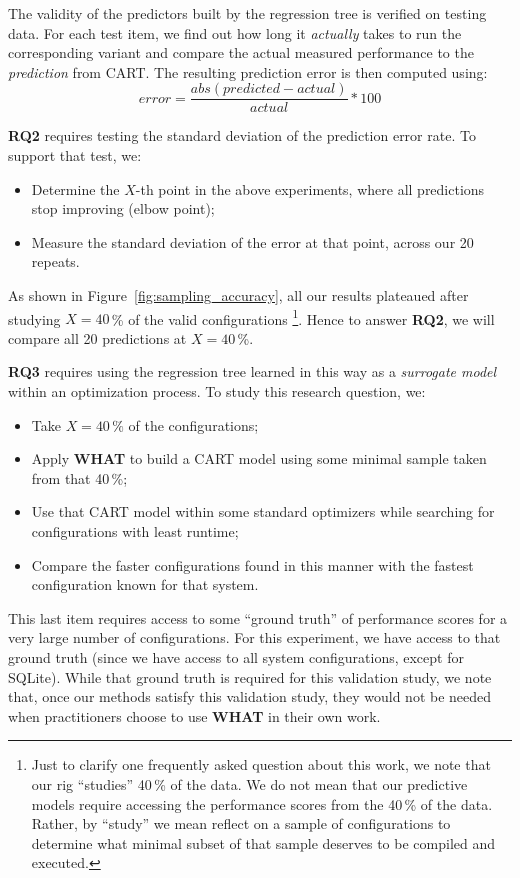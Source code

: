 \documentclass{newsig}
\newcommand{\bi}{\begin{itemize}}%
\newcommand{\ei}{\end{itemize}}
\newcommand{\what}{{\bf WHAT }}
\begin{document}
The validity of the predictors built by the regression tree is verified on testing data. 
For each  test item, we find out how long it {\em actually} takes to run the corresponding variant and compare the actual measured performance to the {\em prediction} from CART. The resulting prediction error is then computed using:
\begin{equation}\label{eq:err}
\mathit{error}=\frac{\mathit{abs}(\mathit{predicted} - \mathit{actual})}{\mathit{actual}}*100
\end{equation}

{\bf RQ2} requires testing the standard deviation of the prediction error rate. To support that test, we:
\bi
\item Determine the $X$-th point in the above experiments, where all predictions stop improving (elbow point);
\item Measure the standard deviation of the error at that point, across our 20 repeats.
\ei
As shown in Figure~\ref{fig:sampling_accuracy}, all our results plateaued after studying $X=40$\,\% of the valid configurations
 \footnote{Just to clarify one frequently asked question about this work, we note
that our rig ``studies'' 40\,\% of the data. We do not mean that our predictive models
 require accessing the performance scores from the 40\,\% of the data. Rather, by ``study'' we mean   reflect 
 on a sample of configurations to determine what minimal subset of that
sample deserves to be compiled and executed.}.
 Hence to answer {\bf RQ2}, we will compare all 20 predictions at $X=40$\,\%.
 
{\bf RQ3} requires using the regression tree learned in this way as a {\em surrogate model} within an optimization process. To study this research question, we:
\bi
\item Take   $X=40\,\%$ of the configurations;
\item Apply \what to build a CART model using some minimal sample taken from that 40\,\%;
\item Use that CART model within some standard optimizers while searching for 
configurations with least runtime;
\item  Compare the faster configurations found in this manner with the fastest configuration
known for that system.
\ei
This last item requires access to some ``ground truth'' of performance scores for a very
large number of configurations. For this experiment, we have access to that ground truth
(since we have access to all system configurations, except for SQLite). While that ground truth is required for this
validation study, we note that, once our methods satisfy this validation study,
they would not be needed when practitioners choose to use \what in their own work.
\end{document}
